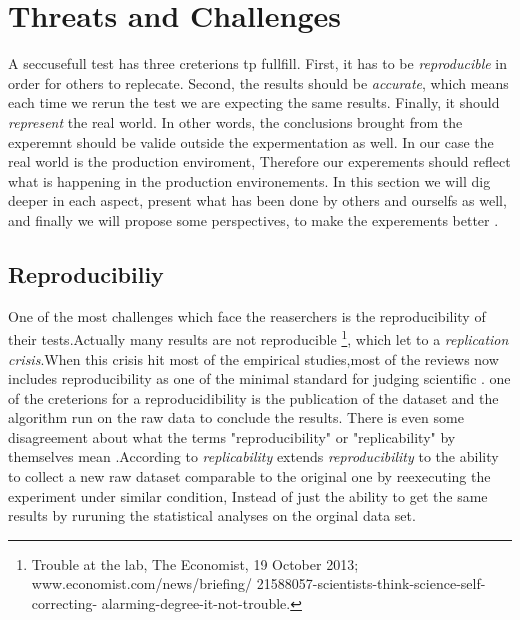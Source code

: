 \section{Threats and Challenges}

A seccusefull test has three creterions tp fullfill. First, it has to be \emph{reproducible} in order for others to replecate. Second, the results should be \emph{accurate}, which means each time we rerun the test we are expecting the same results. Finally, it should \emph{represent} the real world. In other words, the conclusions brought from the experemnt should be valide outside the expermentation as well. In our case the real world is the production enviroment, Therefore our experements should reflect what is happening in the production environements.
In this section we will dig deeper in each aspect, present what has been done by others and ourselfs as well, and finally we will propose some perspectives, to make the experements better .




\subsection{Reproducibiliy}

One of the most challenges which face the reaserchers is the reproducibility of their tests.Actually many results are not reproducible \footnote{Trouble at the lab, The Economist, 19 October 2013;  www.economist.com/news/briefing/ 21588057-scientists-think-science-self-correcting- alarming-degree-it-not-trouble.}, which let to a \emph{replication crisis}.When this crisis hit most of the empirical studies,most of the reviews now includes reproducibility as one of the minimal standard for judging scientific \cite{peng2011reproducible}. one of the creterions for a reproducidibility is the publication of the dataset and the algorithm run on the raw data to conclude the results. There is even some disagreement about what the terms "reproducibility" or "replicability" by themselves mean \cite{goodman2016does} .According to \cite{echtler2018open} \emph{replicability} extends \emph{reproducibility} to the ability to collect a new raw dataset comparable to the original one by reexecuting the experiment under similar condition, Instead of just the ability to get the same results by ruruning the statistical analyses on the orginal data set.

